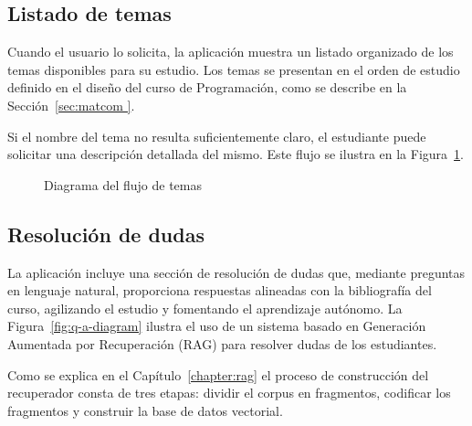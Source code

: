 \documentclass{article}
\begin{document}
\subsection{Listado de temas}

Cuando el usuario lo solicita, la aplicación muestra un listado organizado de los temas disponibles para su estudio. Los temas se presentan en el orden de estudio definido en el diseño del curso de Programación, como se describe en la Sección~\ref{sec:matcom }.

Si el nombre del tema no resulta suficientemente claro, el estudiante puede solicitar una descripción detallada del mismo. Este flujo se ilustra en la Figura~\ref{fig:topics}.

\begin{figure}[h!]
  \centering
\caption{Diagrama del flujo de temas}\label{fig:topics}
\end{figure}

\subsection{Resolución de dudas}

La aplicación incluye una sección de resolución de dudas que, mediante preguntas en lenguaje natural, proporciona respuestas alineadas con la bibliografía del curso, agilizando el estudio y fomentando el aprendizaje autónomo. La Figura~\ref{fig:q-a-diagram} ilustra el uso de un sistema basado en Generación Aumentada por Recuperación (RAG) para resolver dudas de los estudiantes.

Como se explica en el Capítulo~\ref{chapter:rag} el proceso de construcción del recuperador consta de tres etapas: dividir el corpus en fragmentos, codificar los fragmentos y construir la base de datos vectorial.
\end{document}
